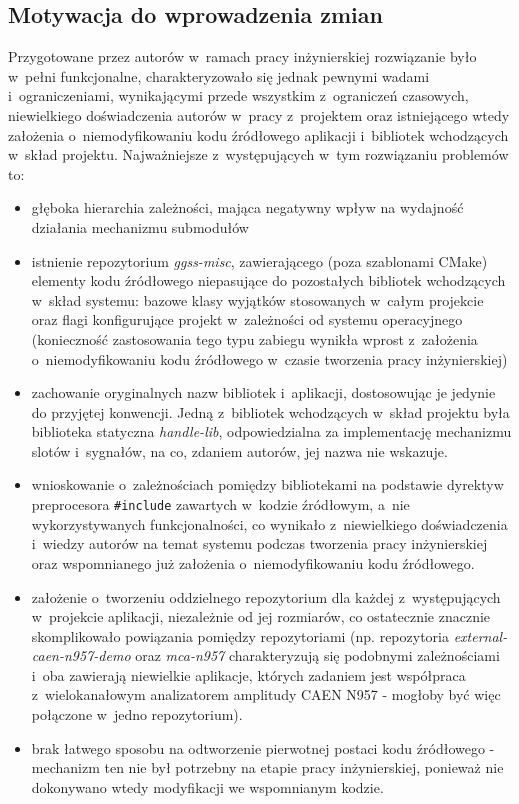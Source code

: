 \subsection{Motywacja do wprowadzenia zmian}
Przygotowane przez autorów w~ramach pracy inżynierskiej rozwiązanie było w~pełni funkcjonalne, charakteryzowało się jednak pewnymi wadami i~ograniczeniami, wynikającymi przede wszystkim z~ograniczeń czasowych, niewielkiego doświadczenia autorów w~pracy z~projektem oraz istniejącego wtedy założenia o~niemodyfikowaniu kodu źródłowego aplikacji i~bibliotek wchodzących w~skład projektu. Najważniejsze z~występujących w~tym rozwiązaniu problemów to:
\begin{itemize}
    \item głęboka hierarchia zależności, mająca negatywny wpływ na wydajność działania mechanizmu submodułów
    \item istnienie repozytorium \emph{ggss-misc}, zawierającego (poza szablonami CMake) elementy kodu źródłowego niepasujące do pozostałych bibliotek wchodzących w~skład systemu: bazowe klasy wyjątków stosowanych w~całym projekcie oraz flagi konfigurujące projekt w~zależności od systemu operacyjnego (konieczność zastosowania tego typu zabiegu wynikła wprost z~założenia o~niemodyfikowaniu kodu źródłowego w~czasie tworzenia pracy inżynierskiej)
    \item zachowanie oryginalnych nazw bibliotek i~aplikacji, dostosowując je jedynie do przyjętej konwencji. Jedną z~bibliotek wchodzących w~skład projektu była biblioteka statyczna \emph{handle-lib}, odpowiedzialna za implementację mechanizmu slotów i~sygnałów, na co, zdaniem autorów, jej nazwa nie wskazuje.
    \item wnioskowanie o~zależnościach pomiędzy bibliotekami na podstawie dyrektyw preprocesora \lstinline{#include} zawartych w~kodzie źródłowym, a~nie wykorzystywanych funkcjonalności, co wynikało z~niewielkiego doświadczenia i~wiedzy autorów na temat systemu podczas tworzenia pracy inżynierskiej oraz wspomnianego już założenia o~niemodyfikowaniu kodu źródłowego.
    \item założenie o~tworzeniu oddzielnego repozytorium dla każdej z~występujących w~projekcie aplikacji, niezależnie od jej rozmiarów, co ostatecznie znacznie skomplikowało powiązania pomiędzy repozytoriami (np. repozytoria \emph{external-caen-n957-demo} oraz \emph{mca-n957} charakteryzują się podobnymi zależnościami i~oba zawierają niewielkie aplikacje, których zadaniem jest współpraca z~wielokanałowym analizatorem amplitudy CAEN N957 - mogłoby być więc połączone w~jedno repozytorium).
    \item brak łatwego sposobu na odtworzenie pierwotnej postaci kodu źródłowego - mechanizm ten nie był potrzebny na etapie pracy inżynierskiej, ponieważ nie dokonywano wtedy modyfikacji we wspomnianym kodzie.
\end{itemize}


